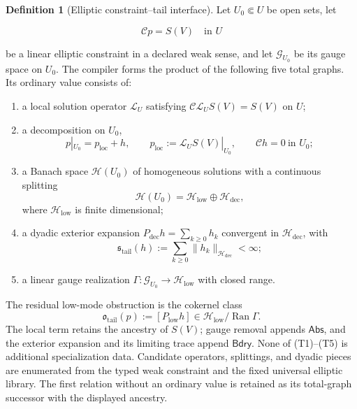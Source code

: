 \documentclass[11pt]{article}
\numberwithin{section}{part}
\theoremstyle{plain}
\theoremstyle{definition}
\newtheorem{definition}[definition]{Definition}
\theoremstyle{remark}
\newcommand{\Abs}{\mathsf{Abs}}
\newcommand{\Bdry}{\mathsf{Bdry}}
\newcommand{\Ran}{\operatorname{Ran}}
\begin{document}
\begin{definition}[Elliptic constraint--tail interface]
\label{def:elliptic-constraint-tail}
Let \(U_0\Subset U\) be open sets, let

\[
 \mathcal C p=S(V)\quad\text{in }U
\]

be a linear elliptic constraint in a declared weak sense, and let
\(\mathcal G_{U_0}\) be its gauge space on \(U_0\).  The compiler forms the
product of the following five total graphs.  Its ordinary value consists of:
\begin{enumerate}[label=\textup{(T\arabic*)}]
\item a local solution operator \(\mathcal L_U\) satisfying
  \(\mathcal C\mathcal L_US(V)=S(V)\) on \(U\);
\item a decomposition on \(U_0\),
  \begin{equation}
   \label{eq:constraint-local-tail-split}
   p|_{U_0}=p_{\mathrm{loc}}+h,
   \qquad p_{\mathrm{loc}}:=\mathcal L_US(V)|_{U_0},
   \qquad \mathcal Ch=0\ \text{in }U_0;
  \end{equation}
\item a Banach space \(\mathcal H(U_0)\) of homogeneous solutions with a
  continuous splitting
  \begin{equation}
   \label{eq:homogeneous-tail-splitting}
   \mathcal H(U_0)=\mathcal H_{\mathrm{low}}
      \oplus\mathcal H_{\mathrm{dec}},
  \end{equation}
  where \(\mathcal H_{\mathrm{low}}\) is finite dimensional;
\item a dyadic exterior expansion
  \(P_{\mathrm{dec}}h=\sum_{k\ge0}h_k\) convergent in
  \(\mathcal H_{\mathrm{dec}}\), with
  \begin{equation}
   \label{eq:tail-summability-invariant}
   \mathfrak s_{\mathrm{tail}}(h)
   :=\sum_{k\ge0}\|h_k\|_{\mathcal H_{\mathrm{dec}}}<\infty;
  \end{equation}
\item a linear gauge realization
  \(\Gamma:\mathcal G_{U_0}\to\mathcal H_{\mathrm{low}}\) with closed
  range.
\end{enumerate}
The residual low-mode obstruction is the cokernel class
\begin{equation}
 \label{eq:tail-cokernel-invariant}
 \mathfrak o_{\mathrm{tail}}(p)
 :=[P_{\mathrm{low}}h]
 \in \mathcal H_{\mathrm{low}}/\Ran\Gamma.
\end{equation}
The local term retains the ancestry of \(S(V)\); gauge removal appends
\(\Abs\), and the exterior expansion and its limiting trace append
\(\Bdry\).
None of \textup{(T1)}--\textup{(T5)} is additional specialization data.
Candidate operators, splittings, and dyadic pieces are enumerated from the
typed weak constraint and the fixed universal elliptic library.  The first
relation without an ordinary value is retained as its total-graph successor
with the displayed ancestry.
\end{definition}
\end{document}
